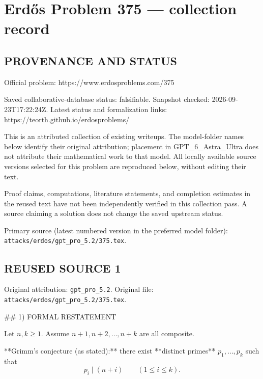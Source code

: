 \section*{Erd\H{o}s Problem 375 --- collection record}

\subsection*{PROVENANCE AND STATUS}
Official problem: https://www.erdosproblems.com/375

Saved collaborative-database status: falsifiable.
Snapshot checked: 2026-09-23T17:22:24Z.
Latest status and formalization links: https://teorth.github.io/erdosproblems/

This is an attributed collection of existing writeups. The model-folder names below identify their original attribution; placement in GPT\_6\_Astra\_Ultra does not attribute their mathematical work to that model. All locally available source versions selected for this problem are reproduced below, without editing their text.

Proof claims, computations, literature statements, and completion estimates in the reused text have not been independently verified in this collection pass. A source claiming a solution does not change the saved upstream status.

Primary source (latest numbered version in the preferred model folder): \texttt{attacks/erdos/gpt\_pro\_5.2/375.tex}.

\subsection*{REUSED SOURCE 1}
Original attribution: \texttt{gpt\_pro\_5.2}.
Original file: \texttt{attacks/erdos/gpt\_pro\_5.2/375.tex}.


## 1) FORMAL RESTATEMENT

Let \(n,k\ge 1\). Assume \(n+1,n+2,\dots,n+k\) are all composite.

**Grimm’s conjecture (as stated):** there exist **distinct primes** \(p_1,\dots,p_k\) such that
\[
 p_i\mid (n+i)\qquad (1\le i\le k).
\]


